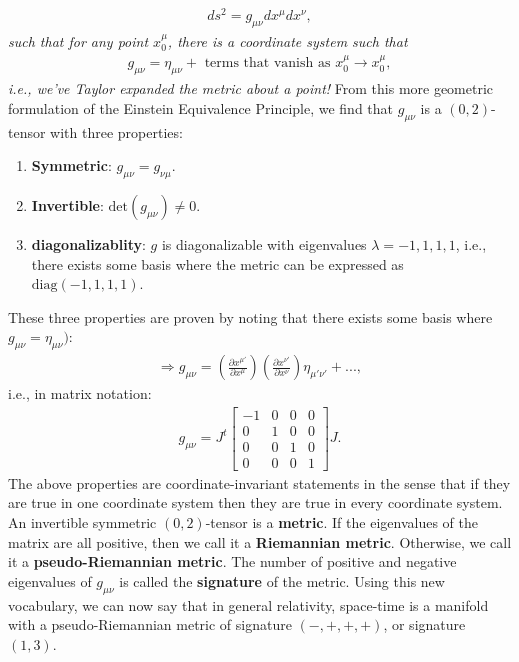 \documentclass[11pt]{article}
\newcommand{\srmetric}[0]{\eta_{\mu \nu}}
\newcommand{\grmetric}[0]{g_{\mu \nu}}
\theoremstyle{definition}
\begin{document}
\begin{align*}
	ds^2 = g_{\mu \nu} dx^\mu dx^\nu, 
\end{align*}
\emph{such that for any point \( x_0^\mu \), there is a coordinate system such that}
\begin{align*}
	g_{\mu \nu} = \eta_{\mu \nu} + \text{ terms that vanish as } x^\mu_0 \rightarrow x_0^\mu, 
\end{align*}
\emph{i.e., we've Taylor expanded the metric about a point!} From this more geometric formulation of the Einstein Equivalence Principle, we find that \( \grmetric \) is a \((0,2)\)-tensor with three properties: 
\begin{enumerate}[noitemsep]
	\item \textbf{Symmetric}: \( \grmetric = g_{\nu \mu} \).
	\item \textbf{Invertible}: \( \text{det}(\grmetric) \neq 0 \). 
	\item \textbf{diagonalizablity}: \( g \) is diagonalizable with eigenvalues \( \lambda = -1, 1, 1, 1 \), i.e., there exists some basis where the metric can be expressed as \( \text{diag}(-1, 1, 1, 1) \). 
\end{enumerate}
These three properties are proven by noting that there exists some basis where \( \grmetric = \srmetric)\):
\begin{align*}
	\Rightarrow \grmetric = \left( \frac{\partial x^{\mu'}}{\partial x^{\mu}} \right) \left( \frac{\partial x^{\nu'}}{\partial x^{\nu}} \right) \eta_{\mu' \nu'} + ... , 
\end{align*}
i.e., in matrix notation:
\begin{align*}
	\grmetric = J^t \begin{bmatrix}
		-1 & 0 & 0 & 0 \\
		0 & 1 & 0 & 0 \\
		0 & 0 & 1 & 0 \\
		0 & 0 & 0 & 1
	\end{bmatrix} J. 
\end{align*}
The above properties are coordinate-invariant statements in the sense that if they are true in one coordinate system then they are true in every coordinate system. 
\newline
\newline
An invertible symmetric \( (0,2)\)-tensor is a \textbf{metric}. If the eigenvalues of the matrix are all positive, then we call it a \textbf{Riemannian metric}. Otherwise, we call it a \textbf{pseudo-Riemannian metric}. The number of positive and negative eigenvalues of \( \grmetric \) is called the \textbf{signature} of the metric. Using this new vocabulary, we can now say that in general relativity, space-time is a manifold with a pseudo-Riemannian metric of signature \( (-, +, +, +) \), or signature \( (1,3) \). 
\end{document}
